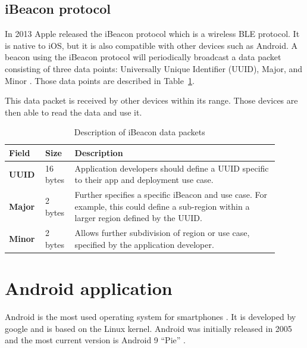 \documentclass[../Main/thesis.tex]{subfiles}
\begin{document}
\subsection{iBeacon protocol}
In 2013 Apple released the iBeacon protocol which is a wireless BLE protocol.
It is native to iOS, but it is also compatible with other devices such as Android.
A beacon using the iBeacon protocol will periodically broadcast a data packet consisting of three data points: Universally Unique Identifier (UUID), Major, and Minor \citep{Apple2014}.
Those data points are described in Table~\ref{tab:iBeacon-protocol}.

This data packet is received by other devices within its range. 
Those devices are then able to read the data and use it.

\begin{table}[h]
\centering
\begin{tabular}{|p{0.1\linewidth}|p{0.1\linewidth}|p{0.7\linewidth}|}
\hline
\textbf{Field} & \textbf{Size} & \textbf{Description}                                                                                                                       \\ \hline
\textbf{UUID}  & 16 bytes      & Application developers should define a UUID specific to their app and deployment use case.                                                 \\ \hline
\textbf{Major} & 2 bytes       & Further specifies a specific iBeacon and use case. For example, this could define a sub-region within a larger region defined by the UUID. \\ \hline
\textbf{Minor} & 2 bytes       & Allows further subdivision of region or use case, specified by the application developer.                                                  \\ \hline
\end{tabular}
\caption{Description of iBeacon data packets \citep[p. 3]{Apple2014}}
\label{tab:iBeacon-protocol}
\end{table}

\section{Android application}
Android is the most used operating system for smartphones \citep{osmarketshare}. 
It is developed by google and is based on the Linux kernel.
Android was initially released in 2005 \citep{Morrill2008a} and the most current version is Android 9 ``Pie'' \cite{Samat2018}.
\end{document}
